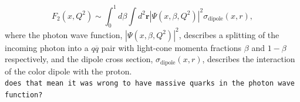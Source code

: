\documentclass[11pt]{article}
\numberwithin{equation}{section}
\numberwithin{table}{section}
\numberwithin{figure}{section}
\newcommand{\comment}[1]{\texttt{\color{red}#1}}
\begin{document}
\begin{equation}
F_2\left(x,Q^2\right)\sim\int^1_0d\beta \int d^2\mathbf{r}\left|\Psi\left(x,\beta,Q^2\right)\right|^2\sigma_{\mathrm{dipole}}\left(x,r\right),
\label{eq:dipole-factorization}
\end{equation}
where the photon wave function, $\left|\Psi\left(x,\beta,Q^2\right)\right|^2$, describes a splitting of the incoming photon into a $q\overline{q}$ pair with light-cone momenta fractions $\beta$ and $1-\beta$ respectively, and the dipole cross section, $\sigma_{\mathrm{dipole}}\left(x,r\right)$, describes the interaction of the color dipole with the proton.\\

\comment{does that mean it was wrong to have massive quarks in the photon wave function?}


%
\end{document}
